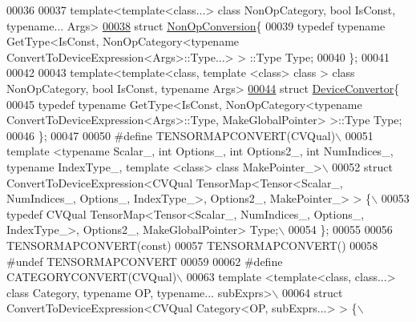 \begin{DoxyCode}
00036 
00037 \textcolor{keyword}{template}<\textcolor{keyword}{template}<\textcolor{keyword}{class}...> \textcolor{keyword}{class }NonOpCategory, \textcolor{keywordtype}{bool} IsConst, \textcolor{keyword}{typename}... Args>
\hyperlink{struct_eigen_1_1_tensor_sycl_1_1internal_1_1_non_op_conversion}{00038} \textcolor{keyword}{struct }\hyperlink{struct_eigen_1_1_tensor_sycl_1_1internal_1_1_non_op_conversion}{NonOpConversion}\{
00039   \textcolor{keyword}{typedef} \textcolor{keyword}{typename} GetType<IsConst, NonOpCategory<typename ConvertToDeviceExpression<Args>::Type...> >
      ::Type Type;
00040 \};
00041 
00042 
00043 \textcolor{keyword}{template}<\textcolor{keyword}{template}<\textcolor{keyword}{class}, \textcolor{keyword}{template} <\textcolor{keyword}{class}> \textcolor{keyword}{class }> \textcolor{keyword}{class }NonOpCategory, bool IsConst, typename Args>
\hyperlink{struct_eigen_1_1_tensor_sycl_1_1internal_1_1_device_convertor}{00044} struct \hyperlink{struct_eigen_1_1_tensor_sycl_1_1internal_1_1_device_convertor}{DeviceConvertor}\{
00045   \textcolor{keyword}{typedef} \textcolor{keyword}{typename} GetType<IsConst, NonOpCategory<typename ConvertToDeviceExpression<Args>::Type, 
      MakeGlobalPointer> >::Type Type;
00046 \};
00047 
00050 \textcolor{preprocessor}{#define TENSORMAPCONVERT(CVQual)\(\backslash\)}
00051 \textcolor{preprocessor}{template <typename Scalar\_, int Options\_, int Options2\_, int NumIndices\_, typename IndexType\_, template
       <class> class MakePointer\_>\(\backslash\)}
00052 \textcolor{preprocessor}{struct ConvertToDeviceExpression<CVQual TensorMap<Tensor<Scalar\_, NumIndices\_, Options\_, IndexType\_>,
       Options2\_, MakePointer\_> > \{\(\backslash\)}
00053 \textcolor{preprocessor}{  typedef CVQual TensorMap<Tensor<Scalar\_, NumIndices\_, Options\_, IndexType\_>, Options2\_,
       MakeGlobalPointer> Type;\(\backslash\)}
00054 \textcolor{preprocessor}{\};}
00055 
00056 TENSORMAPCONVERT(\textcolor{keyword}{const})
00057 TENSORMAPCONVERT()
00058 \textcolor{preprocessor}{#undef TENSORMAPCONVERT}
00059 
00062 \textcolor{preprocessor}{#define CATEGORYCONVERT(CVQual)\(\backslash\)}
00063 \textcolor{preprocessor}{template <template<class, class...> class Category, typename OP, typename... subExprs>\(\backslash\)}
00064 \textcolor{preprocessor}{struct ConvertToDeviceExpression<CVQual Category<OP, subExprs...> > \{\(\backslash\)}

\end{DoxyCode}
